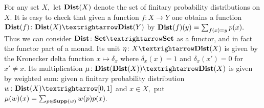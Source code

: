 \documentclass[../main/CT4S-EN-RU]{subfiles}
\begin{document}
\begin{blockRUS}
\end{blockRUS}

\begin{blockENG}
For any set $X,$ let ${\mathbf{Dist}}(X)$ denote the set of finitary probability distributions on $X.$ It is easy to check that given a function $f\colon X{→} Y$ one obtains a function $\Dist(f)\colon\Dist(X){→}\Dist(Y)$ by ${\mathbf{Dist}}(f)(y)=\sum_{f(x)=y}p(x).$ Thus we can consider $\Dist\colon\Set{→}\Set$ as a functor, and in fact the functor part of a monad. Its unit $\eta\colon X{→}\Dist(X)$ is given by the Kronecker delta function $x\mapsto \delta_x$ where $\delta_x(x)=1$ and $\delta_x(x')=0$ for $x'\neq x.$ Its multiplication $\mu\colon\Dist(\Dist(X)){→}\Dist(X)$ is given by weighted sum: given a finitary probability distribution $w\colon\Dist(X){→}[0,1]$ and $x\in X,$ put $\mu(w)(x)=\sum_{p\in{\mathbf{Supp}}(w)}w(p)p(x).$ %
\end{blockENG}

\begin{blockRUS}
\end{blockRUS}
\end{document}
